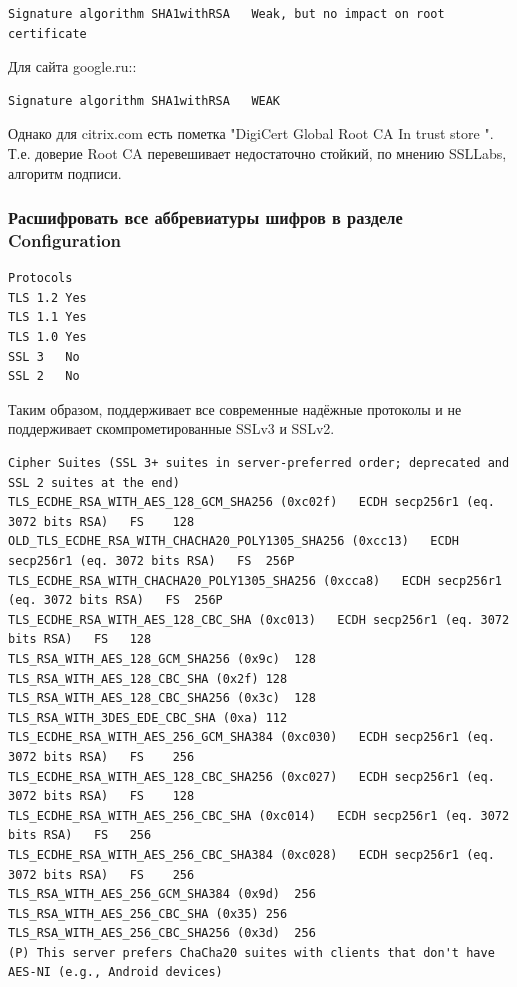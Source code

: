 \documentclass[a4paper]{article}
\begin{document}
\begin{verbatim}
Signature algorithm	SHA1withRSA   Weak, but no impact on root certificate
\end{verbatim}

Для сайта google.ru::

\begin{verbatim}
Signature algorithm	SHA1withRSA   WEAK
\end{verbatim}

Однако для citrix.com есть пометка "DigiCert Global Root CA   In trust store ". Т.е. доверие Root CA перевешивает недостаточно стойкий, по мнению SSLLabs, алгоритм подписи.

\subsubsection{Расшифровать все аббревиатуры шифров в разделе Configuration}

\begin{lstlisting}[numbers=none, keywords={}]
Protocols
TLS 1.2	Yes
TLS 1.1	Yes
TLS 1.0	Yes
SSL 3	No
SSL 2	No
\end{lstlisting}

Таким образом, поддерживает все современные надёжные протоколы и не поддерживает скомпрометированные SSLv3 и SSLv2.

\begin{lstlisting}[numbers=none, keywords={}]
Cipher Suites (SSL 3+ suites in server-preferred order; deprecated and SSL 2 suites at the end)
TLS_ECDHE_RSA_WITH_AES_128_GCM_SHA256 (0xc02f)   ECDH secp256r1 (eq. 3072 bits RSA)   FS	128
OLD_TLS_ECDHE_RSA_WITH_CHACHA20_POLY1305_SHA256 (0xcc13)   ECDH secp256r1 (eq. 3072 bits RSA)   FS	256P
TLS_ECDHE_RSA_WITH_CHACHA20_POLY1305_SHA256 (0xcca8)   ECDH secp256r1 (eq. 3072 bits RSA)   FS	256P
TLS_ECDHE_RSA_WITH_AES_128_CBC_SHA (0xc013)   ECDH secp256r1 (eq. 3072 bits RSA)   FS	128
TLS_RSA_WITH_AES_128_GCM_SHA256 (0x9c)	128
TLS_RSA_WITH_AES_128_CBC_SHA (0x2f)	128
TLS_RSA_WITH_AES_128_CBC_SHA256 (0x3c)	128
TLS_RSA_WITH_3DES_EDE_CBC_SHA (0xa)	112
TLS_ECDHE_RSA_WITH_AES_256_GCM_SHA384 (0xc030)   ECDH secp256r1 (eq. 3072 bits RSA)   FS	256
TLS_ECDHE_RSA_WITH_AES_128_CBC_SHA256 (0xc027)   ECDH secp256r1 (eq. 3072 bits RSA)   FS	128
TLS_ECDHE_RSA_WITH_AES_256_CBC_SHA (0xc014)   ECDH secp256r1 (eq. 3072 bits RSA)   FS	256
TLS_ECDHE_RSA_WITH_AES_256_CBC_SHA384 (0xc028)   ECDH secp256r1 (eq. 3072 bits RSA)   FS	256
TLS_RSA_WITH_AES_256_GCM_SHA384 (0x9d)	256
TLS_RSA_WITH_AES_256_CBC_SHA (0x35)	256
TLS_RSA_WITH_AES_256_CBC_SHA256 (0x3d)	256
(P) This server prefers ChaCha20 suites with clients that don't have AES-NI (e.g., Android devices)	

\end{lstlisting}
\end{document}
